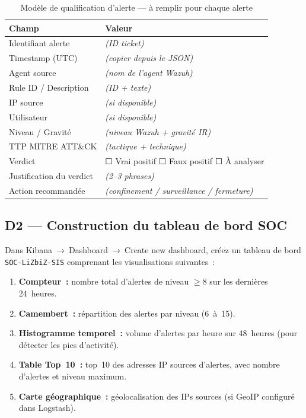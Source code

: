 \begin{table}[H]
\centering\small
\caption{Modèle de qualification d'alerte — à remplir pour chaque alerte}
\label{tab:lab1-qualification}
\begin{tabular}{p{4cm}p{9.5cm}}
\toprule
\textbf{Champ} & \textbf{Valeur} \\
\midrule
Identifiant alerte & \textit{(ID ticket)} \\
Timestamp (UTC) & \textit{(copier depuis le JSON)} \\
Agent source & \textit{(nom de l'agent Wazuh)} \\
Rule ID / Description & \textit{(ID + texte)} \\
IP source & \textit{(si disponible)} \\
Utilisateur & \textit{(si disponible)} \\
Niveau / Gravité & \textit{(niveau Wazuh + gravité IR)} \\
TTP MITRE ATT\&CK & \textit{(tactique + technique)} \\
Verdict & ☐ Vrai positif \quad ☐ Faux positif \quad ☐ À analyser \\
Justification du verdict & \textit{(2--3 phrases)} \\
Action recommandée & \textit{(confinement / surveillance / fermeture)} \\
\bottomrule
\end{tabular}
\end{table}

\subsection{D2 — Construction du tableau de bord SOC}

Dans Kibana~→~Dashboard~→~Create new dashboard, créez un tableau de
bord \texttt{SOC-LiZbiZ-SIS} comprenant les visualisations suivantes~:

\begin{enumerate}
  \item \textbf{Compteur~:} nombre total d'alertes de niveau $\geq 8$
        sur les dernières 24~heures.
  \item \textbf{Camembert~:} répartition des alertes par niveau
        (6~à~15).
  \item \textbf{Histogramme temporel~:} volume d'alertes par heure sur
        48~heures (pour détecter les pics d'activité).
  \item \textbf{Table Top~10~:} top~10 des adresses IP sources
        d'alertes, avec nombre d'alertes et niveau maximum.
  \item \textbf{Carte géographique~:} géolocalisation des IPs sources
        (si GeoIP configuré dans Logstash).
\end{enumerate}

